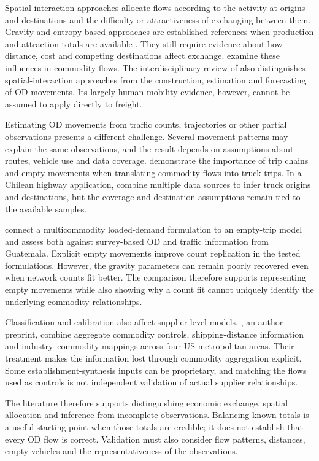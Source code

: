 Spatial-interaction approaches allocate flows according to the activity at
origins and destinations and the difficulty or attractiveness of exchanging
between them. Gravity and entropy-based approaches are established references
when production and attraction totals are available \parencite{sheffi1985}.
They still require evidence about how distance, cost and competing destinations
affect exchange. \Textcite{celik2001} examine these influences in commodity
flows. The interdisciplinary review of \textcite{rong2024} also distinguishes
spatial-interaction approaches from the construction, estimation and forecasting
of OD movements. Its largely human-mobility evidence, however, cannot be assumed
to apply directly to freight.

Estimating OD movements from traffic counts, trajectories or other partial
observations presents a different challenge. Several movement patterns may
explain the same observations, and the result depends on assumptions about
routes, vehicle use and data coverage. \Textcite{raothanachonkun2007} demonstrate
the importance of trip chains and empty movements when translating commodity
flows into truck trips. In a Chilean highway application, \textcite{basso2022}
combine multiple data sources to infer truck origins and destinations, but the
coverage and destination assumptions remain tied to the available samples.

\Textcite{holguin2008} connect a multicommodity loaded-demand formulation to
an empty-trip model and assess both against survey-based OD and traffic
information from Guatemala. Explicit empty movements improve count replication
in the tested formulations. However, the gravity parameters can remain poorly
recovered even when network counts fit better. The comparison therefore supports
representing empty movements while also showing why a count fit cannot uniquely
identify the underlying commodity relationships.

Classification and calibration also affect supplier-level models.
\Textcite{ismael2026}, an author preprint, combine aggregate commodity controls,
shipping-distance information and industry--commodity mappings across four US
metropolitan areas. Their treatment makes the information lost through commodity
aggregation explicit. Some establishment-synthesis inputs can be proprietary,
and matching the flows used as controls is not independent validation of actual
supplier relationships.

The literature therefore supports distinguishing economic exchange, spatial
allocation and inference from incomplete observations. Balancing known totals is
a useful starting point when those totals are credible; it does not establish
that every OD flow is correct. Validation must also consider flow patterns,
distances, empty vehicles and the representativeness of the observations.


